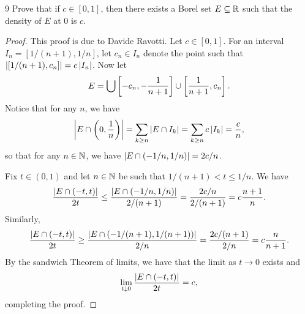 \begin{exercise}{9}
Prove that if $c \in [0, 1]$, then there exists a Borel set $E \subseteq \mathbb{R}$ such that the density of $E$ at 0 is $c$.
\end{exercise}
\begin{proof}
This proof is due to Davide Ravotti.
Let $c \in [0,1]$.
For an interval $I_n = [1/(n+1), 1/n]$, let $c_n \in I_n$ denote the point such that $\left\lvert [1/(n+1), c_n]\right\rvert = c\left\lvert I_n\right\rvert$.
Now let 
\begin{align*}
    E = \bigcup \left[ -c_n, -\frac{1}{n+1}\right] \cup \left[ \frac{1}{n+1}, c_n\right]. 
\end{align*}
Notice that for any $n$, we have
\begin{align*}
    \left\lvert E \cap \left( 0, \frac{1}{n}\right)\right\rvert
    = \sum_{k \geq n} \left\lvert E \cap I_k\right\rvert
    = \sum_{k \geq n} c \left\lvert I_k\right\rvert
    = \frac{c}{n},
\end{align*}
so that for any $n \in \mathbb{N}$, we have $\left\lvert E \cap (-1/n, 1/n)\right\rvert = 2c/n$.

Fix $t \in (0,1)$ and let $n \in \mathbb{N}$ be such that $1/(n+1) < t \leq 1/n$.
We have 
\begin{align*}
    \frac{\left\lvert E \cap (-t, t)\right\rvert}{2t}
    \leq \frac{\left\lvert E \cap (-1/n, 1/n)\right\rvert}{2/(n+1)}
    = \frac{2c/n}{2/(n+1)}
    = c\frac{n+1}{n}.
\end{align*}
Similarly,
\begin{align*}
    \frac{\left\lvert E \cap (-t, t)\right\rvert}{2t}
    \geq \frac{\left\lvert E \cap (-1/(n+1), 1/(n+1))\right\rvert}{2/n}
    = \frac{2c/(n+1)}{2/n}
    = c\frac{n}{n+1}.
\end{align*}
By the sandwich Theorem of limits, we have that the limit as $t \to 0$ exists and
\begin{align*}
    \lim_{t \downarrow 0} \frac{\left\lvert E \cap (-t, t)\right\rvert}{2t} 
    = c,
\end{align*}
completing the proof.
\end{proof} 
